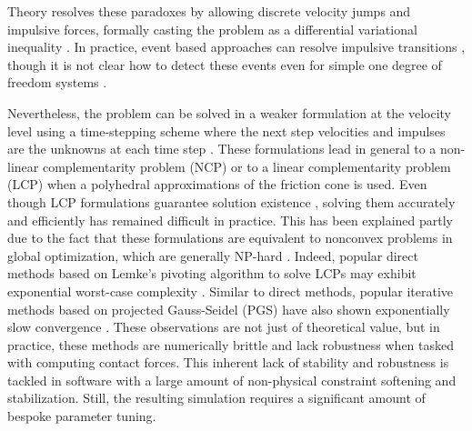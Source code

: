 %
Theory resolves these paradoxes by allowing
discrete velocity jumps and impulsive forces, formally casting the problem as a
differential variational inequality \cite{bib:pang2008differential}. In practice,
event based approaches can resolve impulsive transitions \cite{bib:haug1986},
though it is not clear how to detect these events even for simple one degree of
freedom systems \cite{bib:hogan2017regularization}.

Nevertheless, the problem can be solved in a weaker formulation at the velocity
level using a time-stepping scheme where the next step velocities and impulses
are the unknowns at each time
step \cite{bib:stewart1996implicit, bib:anitescu1997}. These formulations lead
in general to a non-linear complementarity problem (NCP) or to a linear
complementarity problem (LCP) when a polyhedral approximations of the friction
cone is used. Even though LCP formulations guarantee solution existence
\cite{bib:anitescu1997, bib:stewart1998convergence}, solving them accurately and
efficiently has remained difficult in practice. This has been explained
partly due to the fact that these formulations are equivalent to nonconvex problems
in global optimization, which are generally NP-hard \cite{bib:Kaufman2008}.
Indeed, popular direct methods based on Lemke's pivoting algorithm to solve
LCPs may exhibit exponential worst-case complexity \cite{bib:baraff1994fast}. Similar
to direct methods, popular iterative methods based on projected
Gauss-Seidel (PGS) \cite{bib:duriez2006_realistic_haptic_rendering, bib:bullet}
have also shown exponentially slow convergence \cite{bib:erleben2007velocity}.
These observations are not just of theoretical value, but in practice,
these methods are numerically brittle and lack robustness when tasked with computing contact forces.
This inherent lack of stability and robustness is tackled in software with a
large amount of non-physical constraint softening and stabilization.
Still, the resulting simulation requires a significant amount of bespoke parameter tuning.

